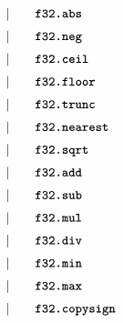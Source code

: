 \begin{alignat*}{9}
    &&       &&\quad | &\quad && \textbf{\texttt{f32.abs}} \quad &&  \\[1mm]
    &&       &&\quad | &\quad && \textbf{\texttt{f32.neg}} \quad &&  \\[1mm]
    &&       &&\quad | &\quad && \textbf{\texttt{f32.ceil}} \quad &&  \\[1mm]
    &&       &&\quad | &\quad && \textbf{\texttt{f32.floor}} \quad &&  \\[1mm]
    &&       &&\quad | &\quad && \textbf{\texttt{f32.trunc}} \quad &&  \\[1mm]
    &&       &&\quad | &\quad && \textbf{\texttt{f32.nearest}} \quad &&  \\[1mm]
    &&       &&\quad | &\quad && \textbf{\texttt{f32.sqrt}} \quad &&  \\[1mm]
    &&       &&\quad | &\quad && \textbf{\texttt{f32.add}} \quad &&  \\[1mm]
    &&       &&\quad | &\quad && \textbf{\texttt{f32.sub}} \quad &&  \\[1mm]
    &&       &&\quad | &\quad && \textbf{\texttt{f32.mul}} \quad &&  \\[1mm]
    &&       &&\quad | &\quad && \textbf{\texttt{f32.div}} \quad &&  \\[1mm]
    &&       &&\quad | &\quad && \textbf{\texttt{f32.min}} \quad &&  \\[1mm]
    &&       &&\quad | &\quad && \textbf{\texttt{f32.max}} \quad &&  \\[1mm]
    &&       &&\quad | &\quad && \textbf{\texttt{f32.copysign}} \quad &&  \\[1mm]
\end{alignat*}

